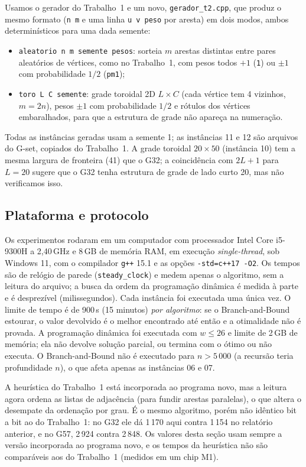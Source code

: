 Usamos o gerador do Trabalho~1 e um novo, \texttt{gerador\_t2.cpp}, que produz o mesmo formato (\texttt{n m} e uma linha \texttt{u v peso} por aresta) em dois modos, ambos determinísticos para uma dada semente:
\begin{itemize}
  \item \texttt{aleatorio n m semente pesos}: sorteia $m$ arestas distintas entre pares aleatórios de vértices, como no Trabalho~1, com pesos todos $+1$ (\texttt{1}) ou $\pm1$ com probabilidade $1/2$ (\texttt{pm1});
  \item \texttt{toro L C semente}: grade toroidal 2D $L\times C$ (cada vértice tem 4 vizinhos, $m=2n$), pesos $\pm1$ com probabilidade $1/2$ e rótulos dos vértices embaralhados, para que a estrutura de grade não apareça na numeração.
\end{itemize}
Todas as instâncias geradas usam a semente 1; as instâncias 11 e 12 são arquivos do G-set, copiados do Trabalho~1. A grade toroidal $20\times50$ (instância 10) tem a mesma largura de fronteira (41) que o G32; a coincidência com $2L+1$ para $L=20$ sugere que o G32 tenha estrutura de grade de lado curto 20, mas não verificamos isso.

\subsection{Plataforma e protocolo}

Os experimentos rodaram em um computador com processador Intel Core i5-9300H a 2,40\,GHz e 8\,GB de memória RAM, em execução \emph{single-thread}, sob Windows 11, com o compilador \texttt{g++} 15.1 e as opções \texttt{-std=c++17 -O2}. Os tempos são de relógio de parede (\texttt{steady\_clock}) e medem apenas o algoritmo, sem a leitura do arquivo; a busca da ordem da programação dinâmica é medida à parte e é desprezível (milissegundos). Cada instância foi executada uma única vez. O limite de tempo é de 900\,s (15 minutos) \emph{por algoritmo}: se o Branch-and-Bound estourar, o valor devolvido é o melhor encontrado até então e a otimalidade não é provada. A programação dinâmica foi executada com $w\le26$ e limite de 2\,GB de memória; ela não devolve solução parcial, ou termina com o ótimo ou não executa. O Branch-and-Bound não é executado para $n>5\,000$ (a recursão teria profundidade $n$), o que afeta apenas as instâncias 06 e 07.

A heurística do Trabalho~1 está incorporada ao programa novo, mas a leitura agora ordena as listas de adjacência (para fundir arestas paralelas), o que altera o desempate da ordenação por grau. É o mesmo algoritmo, porém não idêntico bit a bit ao do Trabalho~1: no G32 ele dá 1\,170 aqui contra 1\,154 no relatório anterior, e no G57, 2\,924 contra 2\,848. Os valores desta seção usam sempre a versão incorporada ao programa novo, e os tempos da heurística não são comparáveis aos do Trabalho~1 (medidos em um chip M1).

